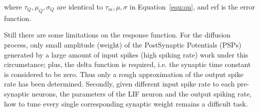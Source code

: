 where $\tau_Q, \mu_Q, \sigma_Q$ are identical to $\tau_m, \mu, \sigma$ in Equation~\ref{equ:ou}, and erf is the error function.

Still there are some limitations on the response function. 
For the diffusion process, only small amplitude (weight) of the PostSynaptic Potentials (PSPs) generated by a large amount of input spikes (high spiking rate) work under this circumstance; 
plus, the delta function is required, i.e. the synaptic time constant is considered to be zero. Thus only a rough approximation of the output spike rate has been determined.
Secondly, given different input spike rate to each pre-synaptic neurons, the parameters of the LIF neuron and the output spiking rate, how to tune every single corresponding synaptic weight remains a difficult task.


